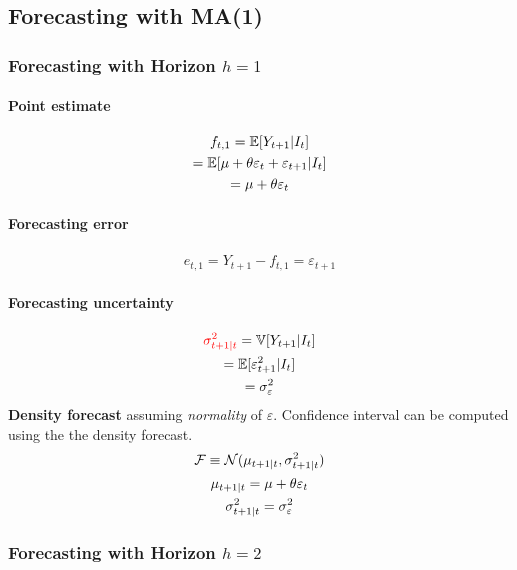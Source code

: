 \documentclass[11pt]{article}
\begin{document}
		\subsection{Forecasting with MA(1)}
			\subsubsection{Forecasting with Horizon $h=1$}
				\paragraph{Point estimate}
					\begin{gather}
						f_{t,1} = \mathbb{E}[{Y_{t+1}|I_t}] \\
						= \mathbb{E}[{\mu + \theta \varepsilon_{t} + \varepsilon_{t+1}|I_t}] \\
						= \mu + \theta \varepsilon_t
					\end{gather}
				\paragraph{Forecasting error}
					\begin{gather}
						e_{t,1} = Y_{t+1} - f_{t,1} = \varepsilon_{t+1}
					\end{gather}
				\paragraph{Forecasting uncertainty}
					\begin{gather}
						\textcolor{red}{\sigma_{t+1|t}^2} = \mathbb{V}[{Y_{t+1}|I_t}] \\
						= \mathbb{E}[{\varepsilon_{t+1}^2|I_t}] \\
						= \sigma^2_\varepsilon
					\end{gather}
				\textbf{Density forecast} assuming \emph{normality} of $\varepsilon$. Confidence interval can be computed using the the density forecast.
					\begin{gather}
						\mathcal{{F}} \equiv \mathcal{{N}}(\mu_{t+1|t}, \sigma_{t+1|t}^2) \\
						\mu_{t+1|t} = \mu + \theta \varepsilon_t \\
						\sigma_{t+1|t}^2 =  \sigma^2_\varepsilon
					\end{gather}
			\subsubsection{Forecasting with Horizon $h=2$}
\end{document}
